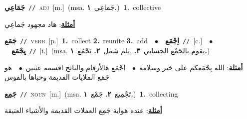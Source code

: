 \documentclass[10pt,a4paper,twoside]{article} %
\begin{document}
\begin{multicols}{2}
{\setlength\topsep{0pt}\textbf{\foreignlanguage{arabic}{جَمَاعِي}}\ {\color{gray}\texttt{//}\color{black}}\ \textsc{adj}\ [m.]\ \color{gray}(msa. \foreignlanguage{arabic}{جَماعِي}~\foreignlanguage{arabic}{\textbf{١.}})\color{black}\ \textbf{1.}~collective\  \begin{flushright}\color{gray}\foreignlanguage{arabic}{\textbf{\underline{\foreignlanguage{arabic}{أمثلة}}}: هاد مجهود جَماعِي}\end{flushright}\color{black}} \vspace{2mm}

{\setlength\topsep{0pt}\textbf{\foreignlanguage{arabic}{جَمَع}}\ {\color{gray}\texttt{//}\color{black}}\ \textsc{verb}\ [p.]\ \textbf{1.}~collect  \textbf{2.}~reunite  \textbf{3.}~add\ \ $\bullet$\ \ \setlength\topsep{0pt}\textbf{\foreignlanguage{arabic}{اِجْمَع}}\ {\color{gray}\texttt{//}\color{black}}\ [c.]\ \ $\bullet$\ \ \setlength\topsep{0pt}\textbf{\foreignlanguage{arabic}{يِجْمَع}}\ {\color{gray}\texttt{//}\color{black}}\ [i.]\ \color{gray}(msa. \foreignlanguage{arabic}{يقوم بالجَمْع الحسابي}~\foreignlanguage{arabic}{\textbf{٣.}}  .\foreignlanguage{arabic}{يلم شمل}~\foreignlanguage{arabic}{\textbf{٢.}}  \foreignlanguage{arabic}{يَجْمَع}~\foreignlanguage{arabic}{\textbf{١.}})\color{black}\  \begin{flushright}\color{gray}\foreignlanguage{arabic}{\textbf{\underline{\foreignlanguage{arabic}{أمثلة}}}: الله يِجْمَعكم على خير وسلامة\ $\bullet$\ \  اجْمَع هالأرقام والناتج اقسمه عثنين\ $\bullet$\ \  هو جَمَع الملايات القديمة وخباها بالقوس}\end{flushright}\color{black}} \vspace{2mm}

{\setlength\topsep{0pt}\textbf{\foreignlanguage{arabic}{جَمِع}}\ {\color{gray}\texttt{//}\color{black}}\ \textsc{noun}\ [m.]\ \color{gray}(msa. \foreignlanguage{arabic}{تَجْمِيع}~\foreignlanguage{arabic}{\textbf{٢.}}  \foreignlanguage{arabic}{جَمْع}~\foreignlanguage{arabic}{\textbf{١.}})\color{black}\ \textbf{1.}~collecting\  \begin{flushright}\color{gray}\foreignlanguage{arabic}{\textbf{\underline{\foreignlanguage{arabic}{أمثلة}}}: عنده هواية جَمِع العملات القديمة والأشياء العتيقة}\end{flushright}\color{black}} \vspace{2mm}


\end{multicols}
\end{document}
